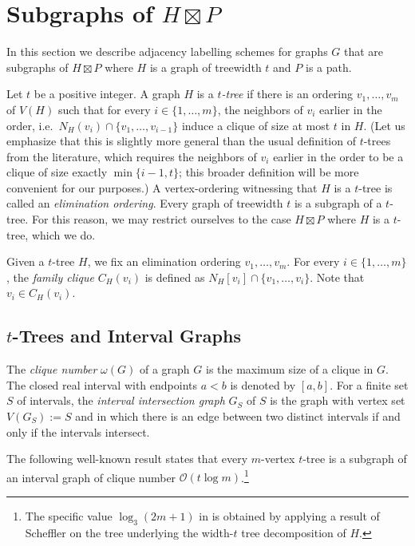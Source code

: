 \documentclass[kpfonts]{patmorin}
\newcommand{\Oh}{\mathcal{O}}
\begin{document}

\section{Subgraphs of $H\boxtimes P$}

In this section we describe adjacency labelling schemes for graphs $G$ that are subgraphs of $H\boxtimes P$ where $H$ is a graph of treewidth $t$ and $P$ is a path.


Let $t$ be a positive integer.
A graph $H$ is a \emph{$t$-tree} if there is an ordering $v_1,\ldots,v_m$ of $V(H)$ such that 
for every $i\in\{1,\ldots,m\}$, the neighbors of $v_i$ earlier in the order, i.e.\ $N_H(v_i) \cap \{v_1,\ldots,v_{i-1}\}$ induce a clique of size at most $t$ in $H$. 
(Let us emphasize that this is slightly more general than the usual definition of $t$-trees from the literature, which requires the neighbors of $v_i$ earlier in the order to be a clique of size exactly $\min\{i-1, t\}$; this broader definition will be more convenient for our purposes.) 
A vertex-ordering witnessing that $H$ is a $t$-tree is called an \emph{elimination ordering}.
Every graph of treewidth $t$ is a subgraph of a $t$-tree. 
For this reason, we may restrict ourselves to the case $H\boxtimes P$ where $H$ is a $t$-tree, which we do.


Given a $t$-tree $H$, we fix an elimination ordering $v_1,\ldots,v_m$.
For every $i\in\{1,\ldots,m\}$, the \emph{family clique} $C_H(v_i)$ is defined as
$N_H[v_i]\cap \{v_1,\ldots,v_{i}\}$. 
Note that $v_i \in C_H(v_i)$.

\subsection{$t$-Trees and Interval Graphs}

The \emph{clique number} $\omega(G)$ of a graph $G$ is the maximum size of a clique in $G$. The closed real interval with endpoints $a<b$ is denoted by $[a,b]$.
For a finite set $S$ of intervals, 
the \emph{interval intersection graph} $G_S$ of $S$ is the graph 
with vertex set $V(G_S):=S$ and in which there is an edge between two distinct intervals 
if and only if the intervals intersect.

The following well-known result states that every $m$-vertex $t$-tree is a subgraph of an interval graph of clique number $\Oh(t\log m)$.\footnote{The specific value $\log_3 (2m+1)$ in  is obtained by applying a result of Scheffler \cite{scheffler:optimal} on the tree underlying the width-$t$ tree decomposition of $H$.}
\end{document}
